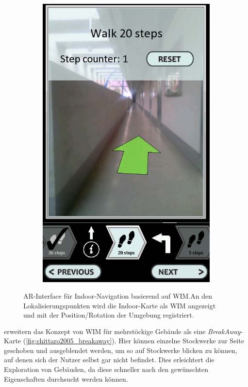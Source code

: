 \begin{figure}
\begin{subfigure}{.195\textwidth}
        \includegraphics[width=\textwidth]{figures/mulloni2011_wim_e.png}
        \caption{}
        \label{sfig:mulloni2011_wim_e}
    \end{subfigure}
    \caption{AR-Interface für Indoor-Navigation basierend auf WIM.\@ An den Lokalisierungspunkten wird die Indoor-Karte als WIM angezeigt und mit der Position/Rotation der Umgebung registriert.}
    \label{fig:mulloni2011_wim}
\end{figure}

\textcite{Chittaro2005} erweitern das Konzept von WIM für mehrstöckige Gebäude als eine \emph{BreakAway}-Karte (\autoref{fig:chittaro2005_breakaway}).
Hier können einzelne Stockwerke zur Seite geschoben und ausgeblendet werden, um so auf Stockwerke blicken zu können, auf denen sich der Nutzer selbst gar nicht befindet.
Dies erleichtert die Exploration von Gebäuden, da diese schneller nach den gewünschten Eigenschaften durchsucht werden können.


